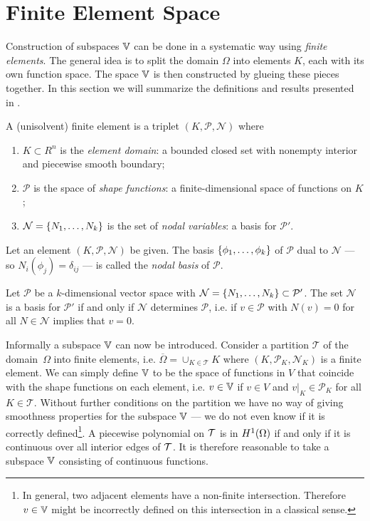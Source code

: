 \documentclass[thesis.tex]{subfiles}
\begin{document}
\section{Finite Element Space}
  \label{sec:deffem}
  Construction of subspaces $\mathbb{V}$ can be done in a systematic way using \emph{finite elements}. 
  The general idea is to split the domain $\Omega$ into elements $K$, each with its own function space.
  The space $\mathbb{V}$ is then constructed by glueing these pieces together. In this section we will summarize the definitions and results
  presented in \cite[Ch~3]{brenner}.
  \begin{defn} 
    A (unisolvent) finite element is a triplet $(K, \mathcal{P}, \mathcal{N})$ where
    \begin{enumerate}[label=(\alph*)]
      \item $K \subset R^n$ is the \emph{element domain}: a bounded closed set with nonempty interior and piecewise smooth boundary;
    \item $\mathcal{P}$ is the space of \emph{shape functions}: a finite-dimensional space of functions on $K$;
  \item $\mathcal{N} = \set{N_1, \dots, N_k}$ is the set of \emph{nodal variables}: a basis for $\mathcal{P}'$.
    \end{enumerate}
  \end{defn}
  \begin{defn}
    \label{def:dualbasis}
    Let an element $(K, \mathcal{P}, \mathcal{N})$ be given. The basis $\set{\phi_1, \dots, \phi_k}$ of $\mathcal{P}$ dual to $\mathcal{N}$ --- so $N_i(\phi_j) = \delta_{ij}$ --- is called the \emph{nodal basis} of $\mathcal{P}$.
  \end{defn}
  \begin{lem}
    Let $\mathcal{P}$ be a $k$-dimensional vector space with $\mathcal{N} = \set{N_1, \dots, N_k} \subset \mathcal{P}'$.
    The set $\mathcal{N}$ is a basis for $\mathcal{P}'$ if and only if $\mathcal{N}$ determines $\mathcal{P}$, i.e. if $v \in \mathcal{P}$ with $N(v) = 0$ for all $N \in \mathcal{N}$ implies that $v = 0$.
  \end{lem}
  Informally a subspace $\mathbb{V}$ can now be introduced. Consider a partition $\mathcal{T}$ of the domain~$\Omega$ into finite elements,
  i.e. $\overline{\Omega} = \cup_{K \in \mathcal{T}} K$ where $(K, \mathcal{P}_K, \mathcal{N}_K)$ is a finite element.
  We can simply define $\mathbb{V}$ to be the space of functions in $V$ that coincide with the shape functions on each element,
  i.e. $v \in \mathbb{V}$ if $v \in V$ and $v|_{K} \in \mathcal{P}_K$ for all $K \in \mathcal{T}$. 
  Without further conditions on the partition we have no way of giving smoothness  properties for the subspace $\mathbb{V}$ --- we do not even know if it is correctly defined\footnote{In general, two adjacent elements have a non-finite intersection. 
  Therefore $v \in \mathbb{V}$ might be incorrectly defined on this intersection in a classical sense.}.
  A piecewise polynomial on $\mathcal{T}$ is in $H^1(\Omega)$ if and only if it is continuous over all interior edges of $\mathcal{T}$.
  It is therefore reasonable to take a subspace $\mathbb{V}$ consisting
  of continuous functions.
\end{document}
